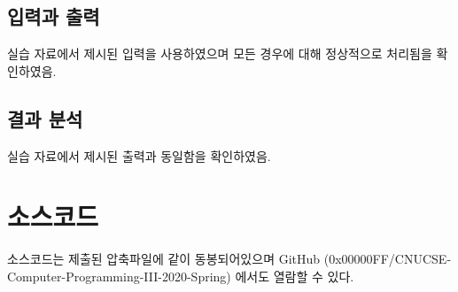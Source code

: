 \documentclass[UTF8]{report}
\begin{document}
        \section{입력과 출력}
            실습 자료에서 제시된 입력을 사용하였으며 모든 경우에 대해 정상적으로 처리됨을 확인하였음.
        \section{결과 분석}
            실습 자료에서 제시된 출력과 동일함을 확인하였음.

    \chapter{소스코드}
        소스코드는 제출된 압축파일에 같이 동봉되어있으며 GitHub (0x00000FF/CNUCSE-Computer-Programming-III-2020-Spring) 에서도 열람할 수 있다.
\end{document}
